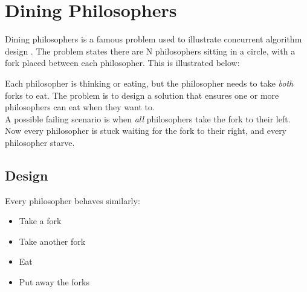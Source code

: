 % 

\chapter{Dining Philosophers}

Dining philosophers is a famous problem used to illustrate concurrent algorithm
design \cite{dining}. The problem states there are N philosophers sitting in a
circle, with a fork placed between each philosopher. This is illustrated
below:\\

\begin{center}
\end{center}

Each philosopher is thinking or eating, but the philosopher needs to take
\textit{both} forks to eat. The problem is to design a solution that ensures one
or more philosophers can eat when they want to. \\

A possible failing scenario is when \textit{all} philosophers take the fork to
their left. Now every philosopher is stuck waiting for the fork to their right, 
and every philosopher starve.

\section{Design}

Every philosopher behaves similarly:
\begin{itemize}
    \item Take a fork 
    \item Take another fork 
    \item Eat
    \item Put away the forks
\end{itemize}

